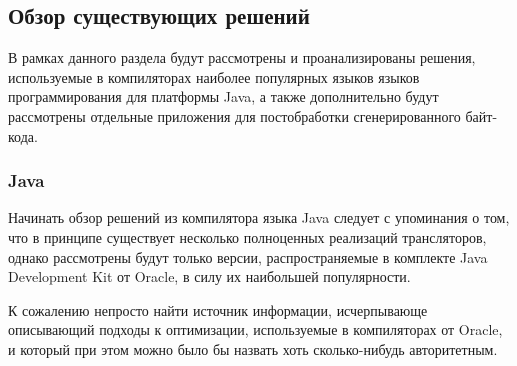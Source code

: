 \subsection{Обзор существующих решений}

В рамках данного раздела будут рассмотрены и проанализированы решения, используемые в компиляторах
наиболее популярных языков языков программирования для платформы Java, а также дополнительно
будут рассмотрены отдельные приложения для постобработки сгенерированного байт-кода.

\subsubsection{Java}
Начинать обзор решений из компилятора языка Java следует с упоминания о том, что в принципе
существует несколько полноценных реализаций трансляторов, однако рассмотрены будут только версии,
распространяемые в комплекте Java Development Kit от Oracle, в силу их наибольшей популярности.

К сожалению непросто найти источник информации, исчерпывающе описывающий подходы к оптимизации,
используемые в компиляторах от Oracle, и который при этом можно было бы назвать хоть сколько-нибудь
авторитетным.


